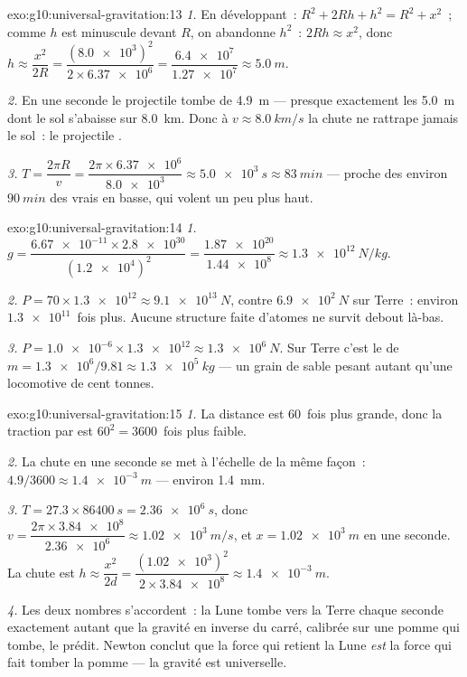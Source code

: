 \begin{solution}{exo:g10:universal-gravitation:13}
\emph{1.} En développant~: $R^2 + 2Rh + h^2 = R^2 + x^2$~; comme $h$
est minuscule devant $R$, on abandonne $h^2$~: $2Rh \approx x^2$, donc
$h \approx \dfrac{x^2}{2R}
= \dfrac{(\num{8.0e3})^2}{2 \times \num{6.37e6}}
= \dfrac{\num{6.4e7}}{\num{1.27e7}} \approx \qty{5.0}{m}$.

\emph{2.} En une seconde le projectile tombe de \qty{4.9}{m} ---
presque exactement les \qty{5.0}{m} dont le sol s'abaisse sur
\qty{8.0}{km}. Donc à $v \approx \qty{8.0}{km/s}$ la chute ne rattrape
jamais le sol~: le projectile .

\emph{3.} $T = \dfrac{2\pi R}{v}
= \dfrac{2\pi \times \num{6.37e6}}{\num{8.0e3}}
\approx \qty{5.0e3}{s} \approx \qty{83}{min}$ --- proche des environ
$\qty{90}{min}$ des vrais  en
 basse, qui volent un peu plus haut.
\end{solution}

\begin{solution}{exo:g10:universal-gravitation:14}
\emph{1.} $g = \dfrac{\num{6.67e-11} \times \num{2.8e30}}
{(\num{1.2e4})^2} = \dfrac{\num{1.87e20}}{\num{1.44e8}}
\approx \qty{1.3e12}{N/kg}.$

\emph{2.} $P = 70 \times \num{1.3e12} \approx \qty{9.1e13}{N}$, contre
$\qty{6.9e2}{N}$ sur Terre~: environ $\num{1.3e11}$~fois plus. Aucune
structure faite d'atomes ne survit debout là-bas.

\emph{3.} $P = \num{1.0e-6} \times \num{1.3e12} \approx
\qty{1.3e6}{N}$. Sur Terre c'est le  de
$m = \num{1.3e6}/9.81 \approx \qty{1.3e5}{kg}$ --- un grain de sable
pesant autant qu'une locomotive de cent tonnes.
\end{solution}

\begin{solution}{exo:g10:universal-gravitation:15}
\emph{1.} La distance est $60$~fois plus grande, donc la traction par
 est $60^2 = 3600$~fois plus faible.

\emph{2.} La chute en une seconde se met à l'échelle de la même façon~:
$4.9/3600 \approx \qty{1.4e-3}{m}$ --- environ \qty{1.4}{mm}.

\emph{3.} $T = 27.3 \times \qty{86400}{s} = \qty{2.36e6}{s}$, donc
$v = \dfrac{2\pi \times \num{3.84e8}}{\num{2.36e6}} \approx
\qty{1.02e3}{m/s}$, et $x = \qty{1.02e3}{m}$ en une seconde. La chute
est $h \approx \dfrac{x^2}{2d}
= \dfrac{(\num{1.02e3})^2}{2 \times \num{3.84e8}}
\approx \qty{1.4e-3}{m}$.

\emph{4.} Les deux nombres s'accordent~: la Lune tombe vers la Terre
chaque seconde exactement autant que la gravité en inverse du carré,
calibrée sur une pomme qui tombe, le prédit. Newton conclut que la
force qui retient la Lune \emph{est} la force qui fait tomber la pomme
--- la gravité est universelle.
\end{solution}

